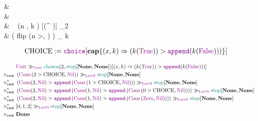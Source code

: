 \begin{codealign}
  &
    \polprd\ \type\ \Unittype\ \where
  \\[-4pt]
  &\quad
    \Unit
  \\
  &
    \
    \chosen
    (n \prd \Nat, k \con \ListNat)
    [\Unittype \times (\Bool \to^{\polprd} \ListNat)]
    \con
    \Unittype
    \coloneq \match_{2}
  \\[-4pt]
  &\quad
    \Unit
    \Rightarrow
    \left(
      \textsf{flip}
      \Rightarrow
      \Cons(n >, \Nil)
    \right)
    \mkCmd_{\ListNat}
    k
\end{codealign}

\begin{align*}
  \text{CHOICE}
  &:=
  \choice[\capab\{ (x, k) \Rightarrow (k(\True)) > \append (k(\False))) \}]
\end{align*}

\begin{align*}
  \phantom{\reducesto_{\cmd}}
  &
  \Unit
  \mkCmd_{\Unittype}
  \chosen(2, \stopListNat[\None, \None])
  [(x, k) \Rightarrow (k(\True)) > \append (k(\False)))]
  \\
  \reducesto_{\cmd}\
  &
  \left(
    \Cons
    \left(
      2 > \text{CHOICE},
      \Nil
    \right)
  \right)
  \mkCmd_{\ListNat}
  \stopListNat[\None, \None]
  \\
  \reducesto_{\cmd}^{\ast}\
  &
  \left(
    \Cons(2, \Nil)
    >
    \append
    \left(
      \Cons
      \left(
        1 > \text{CHOICE},
        \Nil
      \right)
    \right)
  \right)
  \mkCmd_{\ListNat}
  \stopListNat[\None, \None]
  \\
  \reducesto_{\cmd}^{\ast}\
  &
  \left(
    \Cons(2, \Nil)
    >
    \append
    \left(
      \Cons(1, \Nil)
      >
      \append
      \left(
        \Cons
        \left(
          0 > \text{CHOICE},
          \Nil
        \right)
      \right)
    \right)
  \right)
  \mkCmd_{\ListNat}
  \stopListNat[\None, \None]
  \\
  \reducesto_{\cmd}^{\ast}\
  &
  \left(
    \Cons(2, \Nil)
    >
    \append
    \left(
      \Cons(1, \Nil)
      >
      \append
      \left(
        \Cons
        \left(
          \Zero,
          \Nil
        \right)
      \right)
    \right)
  \right)
  \mkCmd_{\ListNat}
  \stopListNat[\None, \None]
  \\
  \reducesto_{\cmd}^{\ast}\
  &
  [0,1,2]
  \mkCmd_{\ListNat}
  \stopListNat[\None, \None]
  \\
  \reducesto_{\cmd}\
  &
  \Done
\end{align*}
